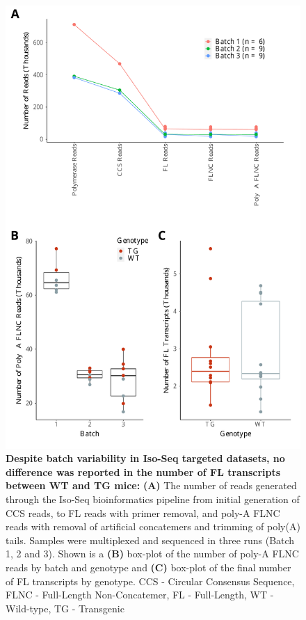 \begin{figure}[!htp]
	\begin{center}
		\includegraphics[page=1,trim={0 1cm 0 0},clip,scale = 0.55]{Figures/TargetedTranscriptome.pdf}
	\end{center}
	\captionsetup{width=0.95\textwidth}
	\caption[Targeted Transcriptome Iso-seq run performance]%
	{\textbf{Despite batch variability in Iso-Seq targeted datasets, no difference was reported in the number of FL transcripts between WT and TG mice:} \textbf{(A)} The number of reads generated through the Iso-Seq bioinformatics pipeline from initial generation of CCS reads, to FL reads with primer removal, and poly-A FLNC reads with removal of artificial concatemers and trimming of poly(A) tails. Samples were multiplexed and sequenced in three runs (Batch 1, 2 and 3). Shown is a \textbf{(B)} box-plot of the number of poly-A FLNC reads by batch and genotype and \textbf{(C)} box-plot of the final number of FL transcripts by genotype. CCS - Circular Consensus Sequence, FLNC - Full-Length Non-Concatemer, FL - Full-Length, WT - Wild-type, TG - Transgenic}
	\label{fig:isoseq_targeted_run_output}
\end{figure}

